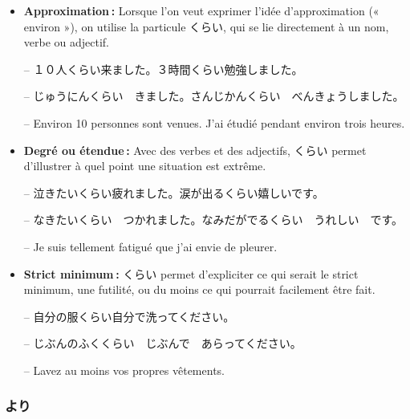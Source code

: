     \begin{itemize}
        \item \textbf{Approximation :} Lorsque l'on veut exprimer l'idée d'approximation (« environ »), on utilise la particule くらい, qui se lie directement à un nom, verbe ou adjectif.
        
        \begin{tcolorbox}
            -- １０人くらい来ました。３時間くらい勉強しました。

            -- じゅうにんくらい　きました。さんじかんくらい　べんきょうしました。

            -- Environ 10 personnes sont venues. J'ai étudié pendant environ trois heures.
        \end{tcolorbox}
        \item \textbf{Degré ou étendue :} Avec des verbes et des adjectifs, くらい permet d'illustrer à quel point une situation est extrême.
        
        \begin{tcolorbox}
            -- 泣きたいくらい疲れました。涙が出るくらい嬉しいです。

            -- なきたいくらい　つかれました。なみだがでるくらい　うれしい　です。

            -- Je suis tellement fatigué que j'ai envie de pleurer.
        \end{tcolorbox}

        \item \textbf{Strict minimum :} くらい permet d'expliciter ce qui serait le strict minimum, une futilité, ou du moins ce qui pourrait facilement être fait.
            
        \begin{tcolorbox}
            -- 自分の服くらい自分で洗ってください。

            -- じぶんのふくくらい　じぶんで　あらってください。

            -- Lavez au moins vos propres vêtements.
        \end{tcolorbox}
    \end{itemize}

        \subsubsection{より}

